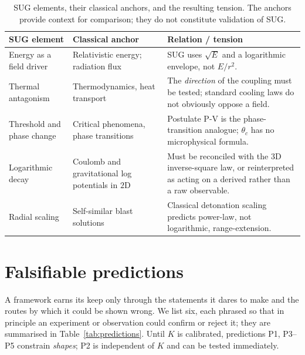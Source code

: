 \documentclass[11pt,a4paper]{article}
\begin{document}
\begin{table}[tb]
  \centering
  \caption{SUG elements, their classical anchors, and the resulting tension.
  The anchors provide context for comparison; they do not constitute
  validation of SUG.}
  \label{tab:anchors}
  \begin{tabular}{@{}p{3.9cm}p{4.0cm}p{6.7cm}@{}}
    \toprule
    \textbf{SUG element} & \textbf{Classical anchor} & \textbf{Relation / tension} \\
    \midrule
    Energy as a field driver
      & Relativistic energy; radiation flux \cite{einstein1905}
      & SUG uses $\sqrt{E}$ and a logarithmic envelope, not $E/r^{2}$. \\
    Thermal antagonism
      & Thermodynamics, heat transport \cite{clausius1865}
      & The \emph{direction} of the coupling must be tested; standard cooling
        laws do not obviously oppose a field. \\
    Threshold and phase change
      & Critical phenomena, phase transitions
      & Postulate P-V is the phase-transition analogue; $\theta_c$ has no
        microphysical formula. \\
    Logarithmic decay
      & Coulomb and gravitational log potentials in $2$D
      & Must be reconciled with the $3$D inverse-square law, or reinterpreted
        as acting on a derived rather than a raw observable. \\
    Radial scaling
      & Self-similar blast solutions \cite{sedov1959}
      & Classical detonation scaling predicts power-law, not logarithmic,
        range-extension. \\
    \bottomrule
  \end{tabular}
\end{table}

\section{Falsifiable predictions}
\label{sec:predictions}

A framework earns its keep only through the statements it dares to make and
the routes by which it could be shown wrong. We list six, each phrased so that
in principle an experiment or observation could confirm or reject it; they are
summarised in Table~\ref{tab:predictions}. Until $K$ is calibrated,
predictions P1, P3--P5 constrain \emph{shapes}; P2 is independent of $K$ and
can be tested immediately.
\end{document}
